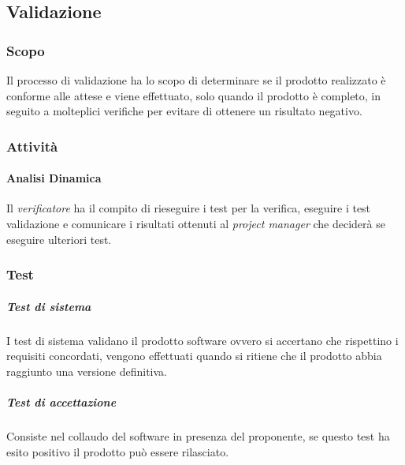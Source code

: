 \subsection{Validazione}

            \subsubsection{Scopo}
            Il processo di validazione ha lo scopo di determinare se il prodotto realizzato è conforme alle attese e viene effettuato, solo quando il prodotto è completo, in seguito a molteplici verifiche per evitare di ottenere un risultato negativo.
            \subsubsection{Attività}
            \paragraph{Analisi Dinamica} \Spazio
            Il \textit{verificatore} ha il compito di rieseguire i test per la verifica, eseguire i test validazione e comunicare i risultati ottenuti al \textit{project manager} che deciderà se eseguire ulteriori test.
            \subsubsection{Test}
            \subparagraph{Test di sistema} \Spazio
            I test di sistema validano il prodotto software ovvero si accertano che rispettino i requisiti concordati, vengono effettuati quando si ritiene che il prodotto abbia raggiunto una versione definitiva.
            \subparagraph{Test di accettazione} \Spazio
            Consiste nel collaudo del software in presenza del proponente, se questo test ha esito positivo il prodotto può essere rilasciato.
            
            
			